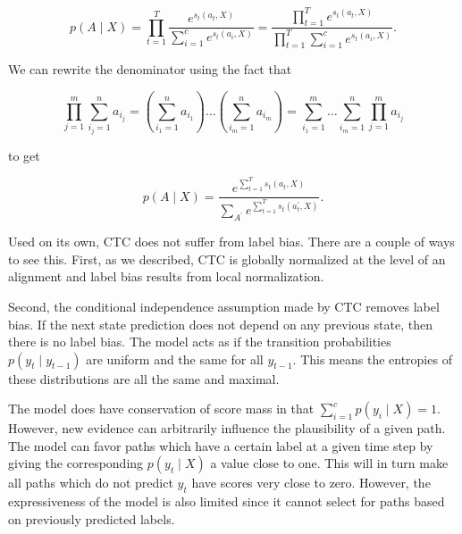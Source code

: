 \documentclass[11pt, letterpaper]{article}
\begin{document}
\begin{equation}
p(A \mid X) = \prod_{t=1}^T \frac{e^{s_t(a_t, X)}}{\sum_{i=1}^c e^{s_t(a_i, X)}}
    = \frac{\prod_{t=1}^T e^{s_t(a_t, X)}}{\prod_{t=1}^T \sum_{i=1}^c e^{s_t(a_i, X)}}.
\end{equation}

We can rewrite the denominator using the fact that

\begin{equation}
\prod_{j=1}^m \sum_{i_j=1}^n a_{i_j} =
    \left(\sum_{i_1=1}^n a_{i_1}\right) \ldots \left(\sum_{i_m=1}^n a_{i_m}\right)
    = \sum_{i_1=1}^m \ldots \sum_{i_m=1}^n \prod_{j=1}^m a_{i_j}
\end{equation}

to get

\begin{equation}
p(A \mid X) = \frac{e^{\sum_{t=1}^T s_t(a_t, X)}}{\sum_{A^\prime} e^{\sum_{t=1}^T s_t(a^\prime_t, X)}}.
\end{equation}

Used on its own, CTC does not suffer from label bias. There are a couple of
ways to see this. First, as we described, CTC is globally normalized at the
level of an alignment and label bias results from local normalization.

Second, the conditional independence assumption made by CTC removes label bias.
If the next state prediction does not depend on any previous state, then there
is no label bias. The model acts as if the transition probabilities $p(y_t \mid
y_{t-1})$ are uniform and the same for all $y_{t-1}$. This means the entropies
of these distributions are all the same and maximal.

The model does have conservation of score mass in that $\sum_{i=1}^c
p(y_i \mid X) = 1$. However, new evidence can arbitrarily influence the
plausibility of a given path. The model can favor paths which have a certain
label at a given time step by giving the corresponding $p(y_t \mid X)$ a value
close to one. This will in turn make all paths which do not predict $y_t$ have
scores very close to zero. However, the expressiveness of the model is also limited
since it cannot select for paths based on previously predicted labels.



\end{document}
